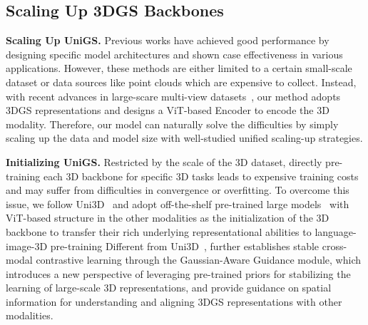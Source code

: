 \subsection{Scaling Up 3DGS Backbones}
\label{sec:S3B}

\textbf{Scaling Up UniGS.} 
Previous works have achieved good performance by designing specific model architectures and shown case effectiveness in various applications. However, these methods are either limited to a certain small-scale dataset or data sources like point clouds which are expensive to collect. Instead, with recent advances in large-scare multi-view datasets~\citep{yu2023mvimgnet}, our method adopts 3DGS representations and designs a ViT-based Encoder to encode the 3D modality. Therefore, our model can naturally solve the difficulties by simply scaling up the data and model size with well-studied unified scaling-up strategies.

\textbf{Initializing UniGS.}
Restricted by the scale of the 3D dataset, directly pre-training each 3D backbone for specific 3D tasks leads to expensive training costs and may suffer from difficulties in convergence or overfitting. To overcome this issue, we follow Uni3D~\citep{zhou2024uni3d} and adopt off-the-shelf pre-trained large models~\citep{sun2023eva, fang2023eva, radford2021learning, caron2021emerging} with ViT-based structure in the other modalities as the initialization of the 3D backbone to transfer their rich underlying representational abilities to language-image-3D pre-training
%
Different from Uni3D~\citep{zhou2024uni3d}, \name{} further establishes stable cross-modal contrastive learning through the Gaussian-Aware Guidance module, which introduces a new perspective of leveraging pre-trained priors for stabilizing the learning of large-scale 3D representations, and provide guidance on spatial information for understanding and aligning 3DGS representations with other modalities.  

